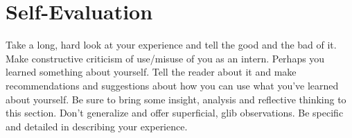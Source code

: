 \chapter{Self-Evaluation}
Take a long, hard look at your experience and tell the good and the bad of it. Make constructive criticism of use/misuse of you as an intern. Perhaps you learned something about yourself. Tell the reader about it and make recommendations and suggestions about how you can use what you’ve learned about yourself. Be sure to bring some insight, analysis and reflective thinking to this section. Don’t generalize and offer superficial, glib observations. Be specific and detailed in describing your experience.